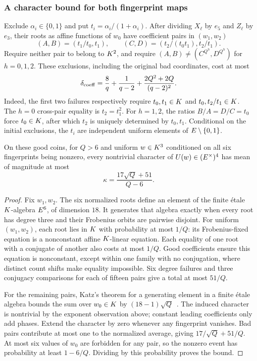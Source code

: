 \subsubsection{A character bound for both fingerprint maps}

Exclude $\alpha_i\in\{0,1\}$ and put $t_i=\alpha_i/(1+\alpha_i)$. After dividing $X_\ell$ by $e_5$ and $Z_\ell$ by $e_3$, their roots as affine functions of $w_0$ have coefficient pairs in $(w_1,w_2)$
\[
 (A,B)=(t_1/t_0,t_1),\qquad
 (C,D)=(t_2/(t_0t_1),t_2/t_1).
\]
Require neither pair to belong to $K^2$, and require $(A,B)\ne(C^{Q^h},D^{Q^h})$ for $h=0,1,2$. These exclusions, including the original bad coordinates, cost at most
\[
 \delta_{\rm coeff}=\frac8q+\frac1{q-2}
       +\frac{2Q^2+2Q}{(q-2)^2}.
\]
Indeed, the first two failures respectively require $t_0,t_1\in K$ and $t_0,t_2/t_1\in K$. The $h=0$ cross-pair equality is $t_2=t_1^2$. For $h=1,2$, the ratios $B/A=D/C=t_0$ force $t_0\in K$, after which $t_2$ is uniquely determined by $t_0,t_1$. Conditional on the initial exclusions, the $t_i$ are independent uniform elements of $E\setminus\{0,1\}$.

\begin{lemma}
On these good coins, for $Q>6$ and uniform $w\in K^3$ conditioned on all six fingerprints being nonzero, every nontrivial character of $U(w)\in(E^\times)^4$ has mean of magnitude at most
\[
 \kappa=\frac{17\sqrt Q+51}{Q-6}.
\]
\end{lemma}
\begin{proof}
Fix $w_1,w_2$. The six normalized roots define an element of the finite \'etale $K$-algebra $E^6$, of dimension $18$. It generates that algebra exactly when every root has degree three and their Frobenius orbits are pairwise disjoint. For uniform $(w_1,w_2)$, each root lies in $K$ with probability at most $1/Q$: its Frobenius-fixed equation is a nonconstant affine $K$-linear equation. Each equality of one root with a conjugate of another also costs at most $1/Q$. Good coefficients ensure this equation is nonconstant, except within one family with no conjugation, where distinct count shifts make equality impossible. Six degree failures and three conjugacy comparisons for each of fifteen pairs give a total at most $51/Q$.

For the remaining pairs, Katz's theorem for a generating element in a finite \'etale algebra bounds the sum over $w_0\in K$ by $(18-1)\sqrt Q$~\cite{katz}. The induced character is nontrivial by the exponent observation above; constant leading coefficients only add phases. Extend the character by zero whenever any fingerprint vanishes. Bad pairs contribute at most one to the normalized average, giving $17/\sqrt Q+51/Q$. At most six values of $w_0$ are forbidden for any pair, so the nonzero event has probability at least $1-6/Q$. Dividing by this probability proves the bound.
\end{proof}

